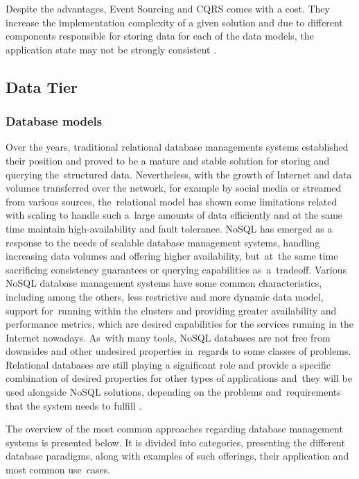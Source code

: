 Despite the advantages, Event Sourcing and CQRS comes with a cost. They increase the implementation complexity of a given solution and due to different components responsible for storing data for each of the data models, the application state may not be strongly consistent \cite{MicroservicesArchitecture}.

\subsection{Data Tier}

\subsubsection{Database models} \label{chapter:database-paradigms}

Over the years, traditional relational database managements systems \cite{RDBMS} established their position and proved to be a mature and stable solution for storing and querying the~structured data. Nevertheless, with the growth of Internet and data volumes transferred over the network, for example by social media or streamed from various sources, the~relational model has shown some limitations related with scaling to handle such a~large amounts of data efficiently and at the same time maintain high-availability and fault tolerance. NoSQL \cite{FowlerNoSQLDefinition} has emerged as a response to the needs of scalable database management systems, handling increasing data volumes and offering higher availability, but~at~the same time sacrificing consistency guarantees or querying capabilities as~a~tradeoff. Various NoSQL database management systems have some common characteristics, including among the others, less restrictive and more dynamic data model, support for~running within the clusters and providing greater availability and performance metrics, which are desired capabilities for the services running in the Internet nowadays. As~with many tools, NoSQL databases are not free from downsides and other undesired properties in~regards to some classes of problems. Relational databases are still playing a significant role and provide a specific combination of desired properties for other types of applications and~they will be used alongside NoSQL solutions, depending on the problems and~requirements that the system needs to fulfill \cite{FowlerNoSQLGOTO}.

The overview of the most common approaches regarding database management systems is presented below. It is divided into categories, presenting the different database paradigms, along with examples of such offerings, their application and most common use~cases.


